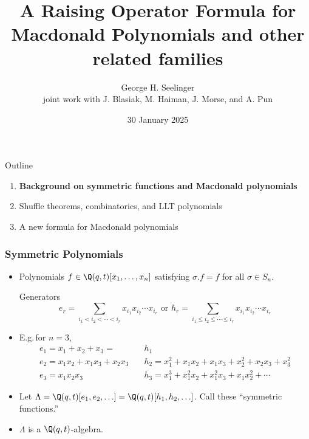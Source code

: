 \documentclass[dvipsnames]{beamer}
\title[Macdonald Catalanimals]{A Raising Operator Formula for
  Macdonald Polynomials and other related families} %
\author[George H. Seelinger]{George H. Seelinger \\ joint work with
  J. Blasiak, M. Haiman, J. Morse, and A. Pun} %
\institute[UMich] %
{
ghseeli@umich.edu\\ %
\medskip
Michigan State University Combinatorics and Graph Theory Seminar\\ %
\medskip
}
\date{30 January 2025} %
\newcommand{\sym}{\Lambda}
\theoremstyle{definition}
\newcounter{c}
\begin{document}
\begin{frame}
\titlepage %
\end{frame}
\begin{frame}{Outline}
  \begin{enumerate}
  \item {\bf Background on symmetric functions and Macdonald polynomials}
  \item Shuffle theorems, combinatorics, and LLT polynomials
  \item A new formula for Macdonald polynomials
  \end{enumerate}
\end{frame}
\begin{frame}
  \frametitle{Symmetric Polynomials}
  \begin{itemize}
  \item Polynomials \(f \in \Q(q,t)[x_1,\ldots,x_n]\) satisfying \(\sigma.f
    = f\) for all \(\sigma \in S_n\).\pause
    \begin{block}{Generators}
    \[
      e_r =
      \sum_{i_1 < i_2 < \cdots < i_r} x_{i_1} x_{i_2} \cdots x_{i_r}
      \text { or }
      h_r = 
      \sum_{i_1 \leq i_2 \leq \cdots \leq i_r} x_{i_1} x_{i_2} \cdots x_{i_r}
    \]\pause 
  \end{block}
    \item E.g.\,for \(n=3\),
    \begin{align*}
      e_1 = x_1 + x_2 + x_3 = & h_1  \\
      e_2 = x_1 x_2 + x_1 x_3 + x_2 x_3 \quad & h_2 = x_1^2 + x_1 x_2 + x_1
                                          x_3 + x_2^2 +  x_2 x_3 +x_3^2  \\
      e_3 = x_1 x_2 x_3 \quad & h_3 = x_1^3 + x_1^2 x_2 + x_1^2 x_3 + x_1
                          x_2^2 + \cdots
    \end{align*} \pause
    \item Let \(\sym =
      \Q(q,t)[e_1,e_2,\ldots] = \Q(q,t)[h_1,h_2,\ldots]\). Call these
      ``symmetric functions.''\pause
    \item \(\sym\) is a \(\Q(q,t)\)-algebra.
  \end{itemize}
\end{frame}
\end{document}

